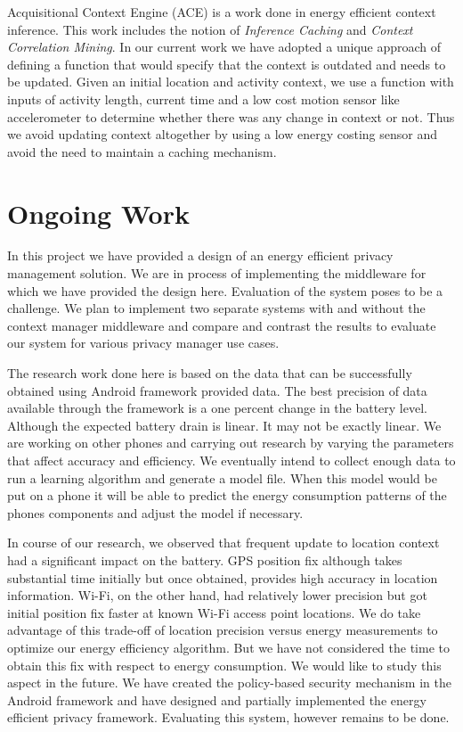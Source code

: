 \documentclass{ubicomp2013}
\begin{document}
Acquisitional Context Engine (ACE) is a work done in energy efficient context inference. This work includes the notion of {\em Inference Caching} and {\em Context Correlation Mining}. In our current work we have adopted a unique approach of defining a function that would specify that the context is outdated and needs to be updated. Given an initial location and activity context, we use a function with inputs of activity length, current time and a low cost motion sensor like accelerometer to determine whether there was any change in context or not. Thus we avoid updating context altogether by using a low energy costing sensor and avoid the need to maintain a caching mechanism.

\section{Ongoing Work}
In this project we have provided a design of an energy efficient privacy management solution. We are in process of implementing the middleware for which we have provided the design here. Evaluation of the system poses to be a challenge. We plan to implement two separate systems with and without the context manager middleware and compare and contrast the results to evaluate our system for various privacy manager use cases.

The research work done here is based on the data that can be successfully obtained using Android framework provided data. The best precision of data available through the framework is a one percent change in the battery level. Although the expected battery drain is linear. It may not be exactly linear. We are working on other phones and carrying out research by varying the parameters that affect accuracy and efficiency. We eventually intend to collect enough data to run a learning algorithm and generate a model file. When this model would be put on a phone it will be able to predict the energy consumption patterns of the phones components and adjust the model if necessary.

In course of our research, we observed that frequent update to location context had a significant impact on the battery. GPS position fix although takes substantial time initially \cite{liu2012gps} but once obtained, provides high accuracy in location information. Wi-Fi, on the other hand, had relatively lower precision but got initial position fix faster at known Wi-Fi access point locations. We do take advantage of this trade-off of location precision versus energy measurements to optimize our energy efficiency algorithm. But we have not considered the time to obtain this fix with respect to energy consumption. We would like to study this aspect in the future. We have created the policy-based security mechanism in the Android framework \cite{ghosh2012ms, ghosh2012privacy} and have designed and partially implemented the energy efficient privacy framework. Evaluating this system, however remains to be done.
\end{document}
